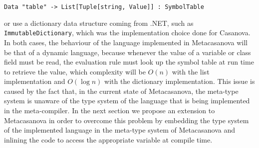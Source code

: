 \begin{lstlisting}
Data "table" -> List[Tuple[string, Value]] : SymbolTable
\end{lstlisting}

\noindent
or use a dictionary data structure coming from .NET, such as \texttt{ImmutableDictionary}, which was the implementation choice done for Casanova. In both cases, the behaviour of the language implemented in Metacasanova will be that of a dynamic language, because whenever the value of a variable or class field must be read, the evaluation rule must look up the symbol table at run time to retrieve the value, which complexity will be $O(n)$ with the list implementation and $O(\log n)$ with the dictionary implementation. This issue is caused by the fact that, in the current state of Metacasanova, the meta-type system is unaware of the type system of the language that is being implemented in the meta-compiler. In the next section we propose an extension to Metacasanova in order to overcome this problem by embedding the type system of the implemented language in the meta-type system of Metacasanova and inlining the code to access the appropriate variable at compile time.

